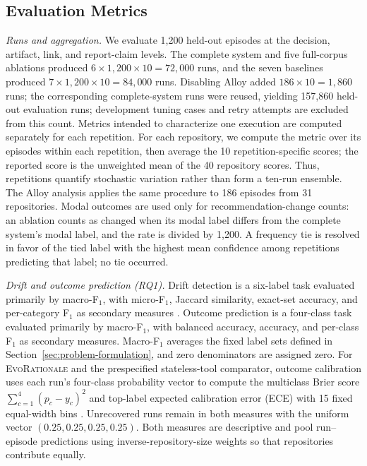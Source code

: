 \documentclass[10pt,conference]{IEEEtran}
\begin{document}
\subsection{Evaluation Metrics}
\label{subsec:evaluation-metrics}
\noindent\textit{Runs and aggregation.} We evaluate 1,200 held-out episodes at the decision, artifact, link, and report-claim levels. The complete system and five full-corpus ablations produced $6\times1{,}200\times10=72{,}000$ runs, and the seven baselines produced $7\times1{,}200\times10=84{,}000$ runs. Disabling Alloy added $186\times10=1{,}860$ runs; the corresponding complete-system runs were reused, yielding 157,860 held-out evaluation runs; development tuning cases and retry attempts are excluded from this count. Metrics intended to characterize one execution are computed separately for each repetition. For each repository, we compute the metric over its episodes within each repetition, then average the 10 repetition-specific scores; the reported score is the unweighted mean of the 40 repository scores. Thus, repetitions quantify stochastic variation rather than form a ten-run ensemble. The Alloy analysis applies the same procedure to 186 episodes from 31 repositories. Modal outcomes are used only for recommendation-change counts: an ablation counts as changed when its modal label differs from the complete system's modal label, and the rate is divided by 1,200. A frequency tie is resolved in favor of the tied label with the highest mean confidence among repetitions predicting that label; no tie occurred.
\par\noindent\textit{Drift and outcome prediction (RQ1).} Drift detection is a six-label task evaluated primarily by macro-F$_1$, with micro-F$_1$, Jaccard similarity, exact-set accuracy, and per-category F$_1$ as secondary measures \cite{Sokolova2009Measures}. Outcome prediction is a four-class task evaluated primarily by macro-F$_1$, with balanced accuracy, accuracy, and per-class F$_1$ as secondary measures. Macro-F$_1$ averages the fixed label sets defined in Section~\ref{sec:problem-formulation}, and zero denominators are assigned zero. For \textsc{EvoRationale} and the prespecified stateless-tool comparator, outcome calibration uses each run's four-class probability vector to compute the multiclass Brier score $\sum_{c=1}^{4}(p_c-y_c)^2$ and top-label expected calibration error (ECE) with 15 fixed equal-width bins \cite{Guo2017Calibration}. Unrecovered runs remain in both measures with the uniform vector $(0.25,0.25,0.25,0.25)$. Both measures are descriptive and pool run--episode predictions using inverse-repository-size weights so that repositories contribute equally.
\end{document}
